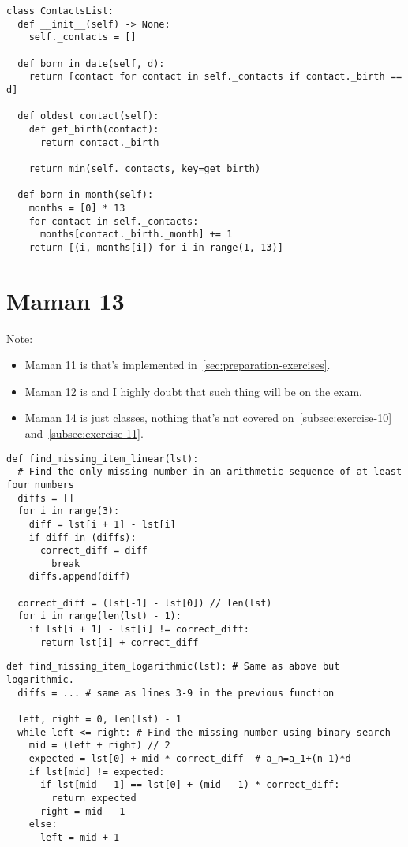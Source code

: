 \documentclass[11pt]{article}
\begin{document}
\begin{multicols}{2}
\begin{lstlisting}
class ContactsList:
  def __init__(self) -> None:
    self._contacts = []

  def born_in_date(self, d):
    return [contact for contact in self._contacts if contact._birth == d]

  def oldest_contact(self):
    def get_birth(contact):
      return contact._birth

    return min(self._contacts, key=get_birth)

  def born_in_month(self):
    months = [0] * 13
    for contact in self._contacts:
      months[contact._birth._month] += 1
    return [(i, months[i]) for i in range(1, 13)]
\end{lstlisting}

\section{Maman 13}
Note:
\begin{itemize}
  \item Maman 11 is  that's implemented in~\cref{sec:preparation-exercises}.
  \item Maman 12 is  and I highly doubt that such thing will be on the exam.
  \item Maman 14 is just classes, nothing that's not covered on~\cref{subsec:exercise-10} and~\cref{subsec:exercise-11}.
\end{itemize}

\pagebreak


\begin{lstlisting}
def find_missing_item_linear(lst):
  # Find the only missing number in an arithmetic sequence of at least four numbers
  diffs = []
  for i in range(3):
    diff = lst[i + 1] - lst[i]
    if diff in (diffs):
      correct_diff = diff
        break
    diffs.append(diff)
      
  correct_diff = (lst[-1] - lst[0]) // len(lst)
  for i in range(len(lst) - 1):
    if lst[i + 1] - lst[i] != correct_diff:
      return lst[i] + correct_diff
\end{lstlisting}

\begin{lstlisting}
def find_missing_item_logarithmic(lst): # Same as above but logarithmic.
  diffs = ... # same as lines 3-9 in the previous function

  left, right = 0, len(lst) - 1
  while left <= right: # Find the missing number using binary search
    mid = (left + right) // 2
    expected = lst[0] + mid * correct_diff  # a_n=a_1+(n-1)*d
    if lst[mid] != expected:
      if lst[mid - 1] == lst[0] + (mid - 1) * correct_diff:
        return expected
      right = mid - 1
    else:
      left = mid + 1
\end{lstlisting}


\end{multicols}
\end{document}
